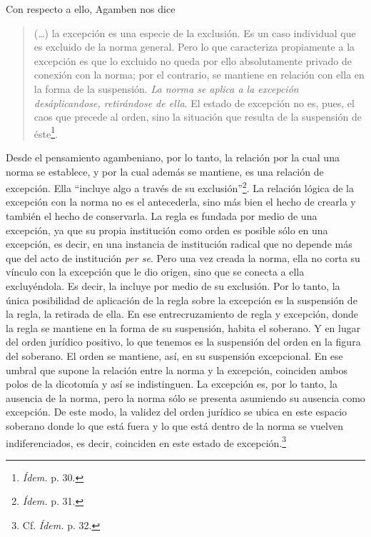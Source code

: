 Con respecto a ello, Agamben nos dice

\begin{quote}
(\dots) la excepción es una especie de la exclusión. Es un caso individual que es excluido de la norma general. Pero lo que caracteriza propiamente a la excepción es que lo excluido no queda por ello absolutamente privado de conexión con la norma; por el contrario, se mantiene en relación con ella en la forma de la suspensión. \emph{La norma se aplica a la excepción desáplicandose, retirándose de ella}. El estado de excepción no es, pues, el caos que precede al orden, sino la situación que resulta de la suspensión de éste\footnote{\emph{Ídem.} p. 30.}.
\end{quote}

Desde el pensamiento agambeniano, por lo tanto, la relación por la cual una norma se establece, y por la cual además se mantiene, es una relación de excepción. Ella \enquote{incluye algo a través de su exclusión}\footnote{\emph{Ídem.} p. 31.}. La relación lógica de la excepción con la norma no es el antecederla, sino más bien el hecho de crearla y también el hecho de conservarla. La regla es fundada por medio de una excepción, ya que su propia institución como orden es posible sólo en una excepción, es decir, en una instancia de institución radical que no depende más que del acto de institución \emph{per se}. Pero una vez creada la norma, ella no corta su vínculo con la excepción que le dio origen, sino que se conecta a ella excluyéndola. Es decir, la incluye por medio de su exclusión. Por lo tanto, la única posibilidad de aplicación de la regla sobre la excepción es la suspensión de la regla, la retirada de ella. En ese entrecruzamiento de regla y excepción, donde la regla se mantiene en la forma de su suspensión, habita el soberano. Y en lugar del orden jurídico positivo, lo que tenemos es la suspensión del orden en la figura del soberano. El orden se mantiene, así, en su suspensión excepcional. En ese umbral que supone la relación entre la norma y la excepción, coinciden ambos polos de la dicotomía y así se indistinguen. La excepción es, por lo tanto, la ausencia de la norma, pero la norma sólo se presenta asumiendo su ausencia como excepción. De este modo, la validez del orden jurídico se ubica en este espacio soberano donde lo que está fuera y lo que está dentro de la norma se vuelven indiferenciados, es decir, coinciden en este estado de excepción.\footnote{Cf. \emph{Ídem.} p. 32.}

